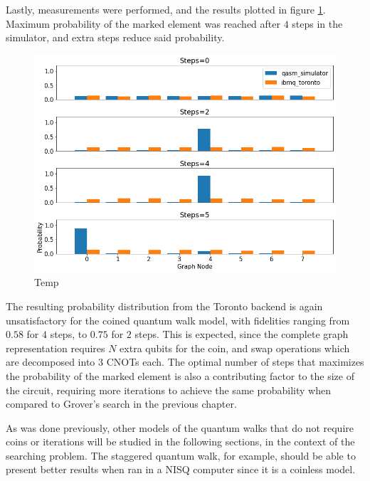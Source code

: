 \documentclass[../../dissertation.tex]{subfiles}
\begin{document}
Lastly, measurements were performed, and the results plotted in figure \ref{fig:coinedSearchQiskitDist}. Maximum probability of the marked element was reached after $4$ steps in the simulator, and extra steps reduce said probability. 
\begin{figure}[!h]
	\centering
	\includegraphics[scale=0.40]{img/Qiskit/CoinedQuantumWalk/Search/CoinedQiskitSearch_N3_M4_S0245}
	\caption{Temp } 
	\label{fig:coinedSearchQiskitDist}
\end{figure}
The resulting probability distribution from the Toronto backend is again unsatisfactory for the coined quantum walk model, with fidelities ranging from $0.58$ for $4$ steps, to $0.75$ for $2$ steps. This is expected, since the complete graph representation requires $N$ extra qubits for the coin, and swap operations which are decomposed into $3$ CNOTs each. The optimal number of steps that maximizes the probability of the marked element is also a contributing factor to the size of the circuit, requiring more iterations to achieve the same probability when compared to Grover's search in the previous chapter.\par
As was done previously, other models of the quantum walks that do not require coins or iterations will be studied in the following sections, in the context of the searching problem. The staggered quantum walk, for example, should be able to present better results when ran in a NISQ computer since it is a coinless model.
\end{document}
